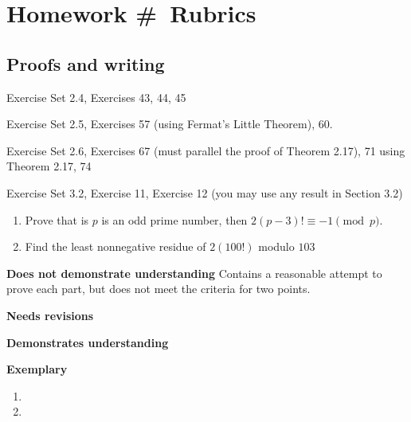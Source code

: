 \documentclass[letterpaper, 11pt]{../ximera}
\begin{document}
\chapter{Homework \#\homework\ Rubrics}

\section*{Proofs and writing}  %
Exercise Set 2.4, Exercises 43, 44, 45

\noindent Exercise Set 2.5, Exercises 57 (using Fermat's Little Theorem), 60. 

\noindent Exercise Set 2.6,  Exercises 67 (must parallel the proof of Theorem 2.17), 71 using Theorem 2.17, 74 

\noindent Exercise Set 3.2, Exercise 11, Exercise 12 (you may use any result in Section 3.2)

\begin{ex}[Exercise 43] 
	\begin{enumerate}[label=(\alph*)]
 		\item Prove that is $p$ is an odd prime number, then $2(p-3)!\equiv -1 \pmod{p}$.
		\item Find the least nonnegative residue of $2(100!)$ modulo $103$
	\end{enumerate}
\end{ex}

\begin{writeRubric}
    \item \textbf{Does not demonstrate understanding}
     Contains a reasonable attempt to prove each part, but does not meet the criteria for two points.
    \item \textbf{Needs revisions}
     
    \item \textbf{Demonstrates understanding}
    
    \item \textbf{Exemplary}
        
\end{writeRubric}
                                       \begin{solution}
 	\begin{enumerate}[label=(\alph*)]
 		\item 
		\item 
	\end{enumerate}
\end{solution}
\end{document}
